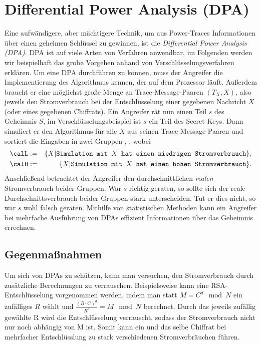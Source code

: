 \section{Differential Power Analysis (DPA)}
Eine aufwändigere, aber mächtigere Technik, um aus Power-Traces
Informationen über einen geheimen Schlüssel zu gewinnen, ist die
\emph{Differential Power Analysis (DPA)}. DPA ist auf viele Arten von
Verfahren anwendbar, im Folgenden werden wir beispielhaft das grobe
Vorgehen anhand von Verschlüsselungsverfahren erklären. Um eine DPA
durchführen zu können, muss der Angreifer die Implementierung des
Algorithmus kennen, der auf dem Prozessor läuft. Außerdem braucht er
eine möglichst große Menge an Trace-Message-Paaren $(T_X, X)$, also
jeweils den Stromverbrauch bei der Entschlüsselung einer gegebenen
Nachricht $X$ (oder eines gegebenen Chiffrats).
Ein Angreifer rät nun einen Teil $s$ des Geheimnis $S$, im
Verschlüsselungsbeispiel ist $s$ ein Teil des Secret Keys. Dann
simuliert er den Algorithmus für alle $X$ aus seinen
Trace-Message-Paaren und sortiert die Eingaben in zwei Gruppen \calL,
\calH, wobei
\begin{eqnarray*}
\calL & := &\{X| \texttt{Simulation mit $X$ hat einen niedrigen
  Stromverbrauch}\},\\
\calH & := &\{X| \texttt{Simulation mit $X$ hat einen hohen
  Stromverbrauch}\}.
\end{eqnarray*}
Anschließend betrachtet der Angreifer den durchschnittlichen
\textit{realen} Stromverbrauch beider Gruppen. War $s$ richtig geraten,
so sollte sich der reale Durchschnittsverbrauch beider Gruppen stark
unterscheiden. Tut er dies nicht, so war $s$ wohl falsch
geraten. Mithilfe von statistischen Methoden kann ein Angreifer bei
mehrfache Ausführung von DPAs effizient Informationen über das Geheimnis
errechnen. 

\subsection{Gegenmaßnahmen}
Um sich von DPAs zu schützen, kann man versuchen, den Stromverbrauch
durch zusätzliche Berechnungen zu verrauschen. Beispielsweise kann eine
RSA-Entschlüsselung vorgenommen werden, indem man statt $M = C^d \mod N$
ein zufälliges $R$ wählt und $\frac{(R\cdot C)^d}{R^d} = M \mod N$ berechnet. Durch das
jeweils zufällig gewählte R wird die Entschlüsselung verrauscht, sodass
der Stromverbrauch nicht nur noch abhängig von M ist. Somit kann ein und
das selbe Chiffrat bei mehrfacher Entschlüsslung zu stark verschiedenen
Stromverbräuchen führen. 


